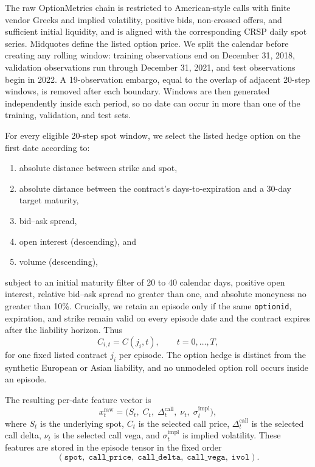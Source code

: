 \documentclass[sigconf]{acmart}
\begin{document}
The raw OptionMetrics chain is restricted to American-style calls with finite
vendor Greeks and implied volatility, positive bids, non-crossed offers, and
sufficient initial liquidity, and is aligned with the corresponding CRSP
daily spot series. Midquotes define the listed option price. We split the
calendar before creating any
rolling window: training observations end on December 31, 2018, validation
observations run through December 31, 2021, and test observations begin in
2022. A 19-observation embargo, equal to the overlap of adjacent 20-step
windows, is removed after each boundary. Windows are then generated
independently inside each period, so no date can occur in more than one of the
training, validation, and test sets.

For every eligible 20-step spot window, we select the listed hedge option on
the first date according to:
\begin{enumerate}
    \item absolute distance between strike and spot,
    \item absolute distance between the contract's days-to-expiration and a 30-day target maturity,
    \item bid--ask spread,
    \item open interest (descending), and
    \item volume (descending),
\end{enumerate}
subject to an initial maturity filter of 20 to 40 calendar days, positive open
interest, relative bid--ask spread no greater than one, and absolute moneyness
no greater than 10\%. Crucially, we retain an episode only if the same
\texttt{optionid}, expiration, and strike remain valid on every episode date
and the contract expires after the liability horizon. Thus
\[
C_{i,t}=C(j_i,t), \qquad t=0,\ldots,T,
\]
for one fixed listed contract $j_i$ per episode. The option hedge is distinct
from the synthetic European or Asian liability, and no unmodeled option roll
occurs inside an episode.

The resulting per-date feature vector is
\[
x_t^{\mathrm{raw}} = \bigl(S_t,\; C_t,\; \Delta^{\mathrm{call}}_t,\; \nu_t,\; \sigma^{\mathrm{impl}}_t \bigr),
\]
where $S_t$ is the underlying spot, $C_t$ is the selected call price, $\Delta^{\mathrm{call}}_t$ is the selected call delta, $\nu_t$ is the selected call vega, and $\sigma^{\mathrm{impl}}_t$ is implied volatility. These features are stored in the episode tensor in the fixed order
\[
(\texttt{spot},\; \texttt{call\_price},\; \texttt{call\_delta},\; \texttt{call\_vega},\; \texttt{ivol}).
\]
\end{document}
